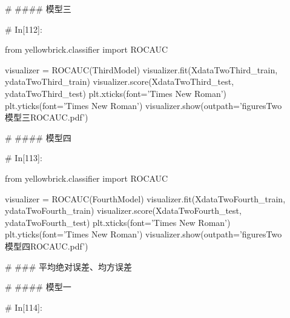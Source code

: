 \documentclass{MathorCupmodeling}
\begin{document}
\begin{python}
	# #### 模型三
	
	# In[112]:
	
	
	from yellowbrick.classifier import ROCAUC
	
	visualizer = ROCAUC(ThirdModel)
	visualizer.fit(XdataTwoThird_train, ydataTwoThird_train)
	visualizer.score(XdataTwoThird_test, ydataTwoThird_test)
	plt.xticks(font='Times New Roman')
	plt.yticks(font='Times New Roman')
	visualizer.show(outpath='figuresTwo\\[附件2]模型三ROCAUC.pdf')
	
	# #### 模型四
	
	# In[113]:
	
	
	from yellowbrick.classifier import ROCAUC
	
	visualizer = ROCAUC(FourthModel)
	visualizer.fit(XdataTwoFourth_train, ydataTwoFourth_train)
	visualizer.score(XdataTwoFourth_test, ydataTwoFourth_test)
	plt.xticks(font='Times New Roman')
	plt.yticks(font='Times New Roman')
	visualizer.show(outpath='figuresTwo\\[附件2]模型四ROCAUC.pdf')
	
	# ### 平均绝对误差、均方误差
	
	# #### 模型一
	
	# In[114]:
	

\end{python}
\end{document}
